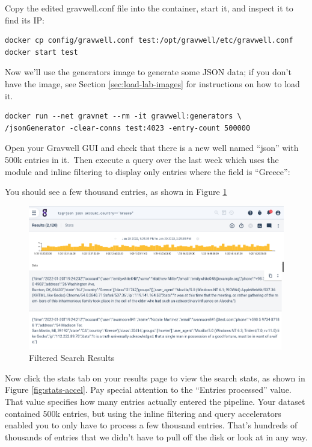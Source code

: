 {Copy the edited gravwell.conf file into the container, start it, and inspect it
to find its IP:

\begin{Verbatim}[breaklines=true]
docker cp config/gravwell.conf test:/opt/gravwell/etc/gravwell.conf
docker start test
\end{Verbatim}

Now we'll use the generators image to generate some JSON data; if you don't have the  image, see Section \ref{sec:load-lab-images} for instructions on how to load it.

\begin{Verbatim}[breaklines=true]
docker run --net gravnet --rm -it gravwell:generators \
/jsonGenerator -clear-conns test:4023 -entry-count 500000
\end{Verbatim}

Open your Gravwell GUI and check that there is a new well named
``json'' with 500k entries in it.~Then execute a query over the last
week which uses the \code{json} module and inline filtering to display only
entries where the \code{account.country} field is ``Greece'':


You should see a few thousand entries, as shown in Figure \ref{fig:greece}

\begin{figure}
	\includegraphics{images/greece-accel.png}
	\caption{Filtered Search Results}
	\label{fig:greece}
\end{figure}

Now click the stats tab on your results page to view the search stats, as shown in Figure \ref{fig:stats-accel}.
Pay special attention to the ``Entries processed'' value. That value
specifies how many entries actually entered the pipeline. Your dataset
contained 500k entries, but using the inline filtering and query
accelerators enabled you to only have to process a few thousand entries.
That's hundreds of thousands of entries that we didn't have to pull off
the disk or look at in any way.

}
